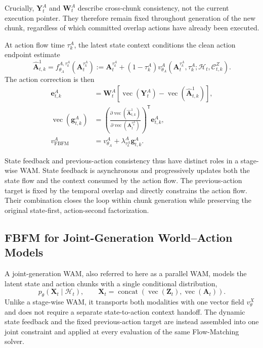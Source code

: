 Crucially, $\mathbf Y_t^A$ and $\mathbf W_t^A$ describe cross-chunk consistency,
not the current execution pointer. They therefore remain fixed throughout generation
of the new chunk, regardless of which committed overlap actions have already been
executed.

At action flow time $\tau_k^A$, the latest state context conditions the clean action
endpoint estimate
\begin{equation}
    \hat{\mathbf A}_{t,k}^1
    =
    f_{\theta_A}^{A,\tau_k^A}(\mathbf A_t^{\tau_k^A})
    :=
    \mathbf A_t^{\tau_k^A}
    +(1-\tau_k^A)
    v_{\theta_A}^A
    \!\left(
        \mathbf A_t^{\tau_k^A},\tau_k^A;
        \mathcal H_t,\mathcal C_{t,k}^Z
    \right).
    \label{eq:action-clean-endpoint}
\end{equation}
The action correction is then
\begin{align}
    \mathbf e_{t,k}^A
    &=
    \mathbf W_t^A
    \left[
        \operatorname{vec}(\mathbf Y_t^A)
        -
        \operatorname{vec}(\hat{\mathbf A}_{t,k}^1)
    \right],
    \label{eq:action-feedback-error}\\
    \operatorname{vec}(\mathbf g_{t,k}^A)
    &=
    \left(
        \frac{\partial\operatorname{vec}(\hat{\mathbf A}_{t,k}^1)}
             {\partial\operatorname{vec}(\mathbf A_t^{\tau_k^A})}
    \right)^{\mathsf T}
    \mathbf e_{t,k}^A,
    \label{eq:action-feedback-vjp}\\
    v_{\mathrm{FBFM}}^A
    &=
    v_{\theta_A}^A
    +\lambda_{\tau_k^A}^A\mathbf g_{t,k}^A.
    \label{eq:guided-action-flow}
\end{align}

State feedback and previous-action consistency thus have distinct roles in a
stage-wise WAM. State feedback is asynchronous and progressively updates both the
state flow and the context consumed by the action flow. The previous-action target
is fixed by the temporal overlap and directly constrains the action flow. Their
combination closes the loop within chunk generation while preserving the original
state-first, action-second factorization.

\subsection{FBFM for Joint-Generation World--Action Models}
\label{sec:method:joint}

A joint-generation WAM, also referred to here as a parallel WAM, models the latent
state and action chunks with a single conditional distribution,
\begin{equation}
    p_\theta(\mathbf X_t\mid\mathcal H_t),
    \qquad
    \mathbf X_t
    =
    \operatorname{concat}
    \!\left(
        \operatorname{vec}(\mathbf Z_t),
        \operatorname{vec}(\mathbf A_t)
    \right).
    \label{eq:joint-generation-model}
\end{equation}
Unlike a stage-wise WAM, it transports both modalities with one vector field
$v_\theta^X$ and does not require a separate state-to-action context handoff. The
dynamic state feedback and the fixed previous-action target are instead assembled
into one joint constraint and applied at every evaluation of the same Flow-Matching
solver.

